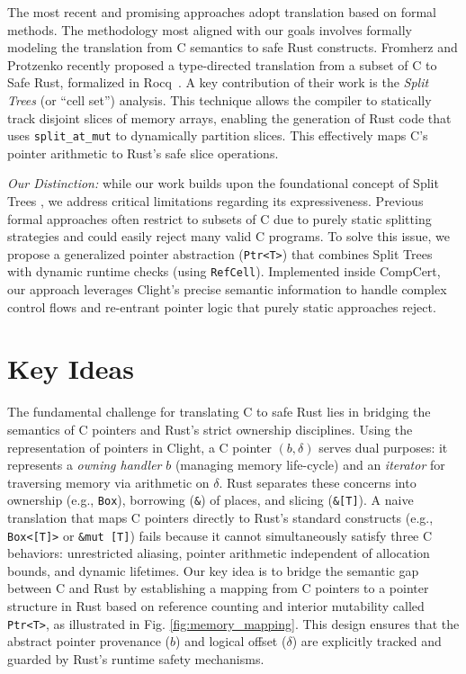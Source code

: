 \documentclass{llncs} %
\begin{document}
The most recent and promising approaches adopt translation based on formal methods.
The methodology most aligned with our goals involves formally modeling the translation from C semantics to safe Rust constructs. Fromherz and Protzenko recently proposed a type-directed translation from a subset of C to Safe Rust, formalized in Rocq~\cite{Fromherz2024}. A key contribution of their work is the \emph{Split Trees} (or ``cell set'') analysis. This technique allows the compiler to statically track disjoint slices of memory arrays, enabling the generation of Rust code that uses \texttt{split\_at\_mut} to dynamically partition slices. This effectively maps C's pointer arithmetic to Rust's safe slice operations.

\emph{Our Distinction:} while our work builds upon the foundational concept of Split Trees \cite{Fromherz2024}, we address critical limitations regarding its expressiveness. Previous formal approaches often restrict to subsets of C due to purely static splitting strategies and could easily reject many valid C programs. To solve this issue, we propose a generalized pointer abstraction (\texttt{Ptr<T>}) that combines Split Trees with dynamic runtime checks (using \texttt{RefCell}). Implemented inside CompCert, our approach leverages Clight's precise semantic information to handle complex control flows and re-entrant pointer logic that purely static approaches reject.

\section{Key Ideas}
\label{sec:algorithm}

The fundamental challenge for translating C to safe Rust lies in bridging the semantics of C pointers and Rust's strict ownership disciplines.
%
Using the representation of pointers in Clight, a C pointer $(b, \delta)$ serves dual purposes: it represents a \textit{owning handler} $b$ (managing memory life-cycle) and an \textit{iterator} for traversing memory via arithmetic on $\delta$. Rust separates these concerns into ownership (e.g., \texttt{Box}), borrowing (\texttt{\&}) of places, and slicing (\texttt{\&[T]}). A naive translation that maps C pointers directly to Rust's standard constructs (e.g., \texttt{Box<[T]>} or \texttt{\&mut [T]}) fails because it cannot simultaneously satisfy three C behaviors: unrestricted aliasing, pointer arithmetic independent of allocation bounds, and dynamic lifetimes.
Our key idea is to bridge the semantic gap between C and Rust by establishing a mapping from C pointers to a pointer structure in Rust based on reference counting and interior mutability called \texttt{Ptr<T>}, as illustrated in Fig. \ref{fig:memory_mapping}. This design ensures that the abstract pointer provenance ($b$) and logical offset ($\delta$) are explicitly tracked and guarded by Rust's runtime safety mechanisms.
%
\end{document}
